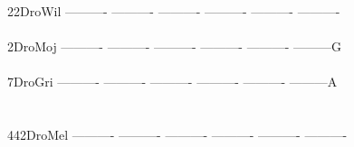 \documentclass[11pt,twoside,reqno,a4paper]{article}
\begin{document}
{22\hspace*{3\charwidth}DroWil	----------	----------	----------	----------	----------	----------	\\
\hspace*{5\charwidth}\hspace*{7\charwidth}\hspace*{1\charwidth}\hspace*{1\charwidth}\hspace*{1\charwidth}\hspace*{1\charwidth}\hspace*{1\charwidth}\hspace*{1\charwidth}\\
2\hspace*{4\charwidth}DroMoj	----------	----------	----------	----------	----------	---------G	\\
\hspace*{5\charwidth}\hspace*{7\charwidth}\hspace*{1\charwidth}\hspace*{1\charwidth}\hspace*{1\charwidth}\hspace*{1\charwidth}\hspace*{1\charwidth}\hspace*{1\charwidth}\\
7\hspace*{4\charwidth}DroGri	----------	----------	----------	----------	----------	---------A	\\
\hspace*{5\charwidth}\hspace*{7\charwidth}\hspace*{1\charwidth}\hspace*{1\charwidth}\hspace*{1\charwidth}\hspace*{1\charwidth}\hspace*{1\charwidth}\hspace*{1\charwidth}\\
\\
442\hspace*{2\charwidth}DroMel	----------	----------	----------	----------	----------	----------	\\
\hspace*{5\charwidth}\hspace*{7\charwidth}\hspace*{1\charwidth}\hspace*{1\charwidth}\hspace*{1\charwidth}\hspace*{1\charwidth}\hspace*{1\charwidth}\hspace*{1\charwidth}\\
}
\end{document}
